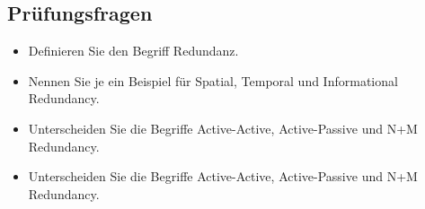 \subsection{Prüfungsfragen}

\begin{itemize}
	\item Definieren Sie den Begriff Redundanz.
	\item Nennen Sie je ein Beispiel für Spatial, Temporal und Informational Redundancy.
	\item Unterscheiden Sie die Begriffe Active-Active, Active-Passive und N+M Redundancy.
\end{itemize}

\begin{itemize}
	\item Unterscheiden Sie die Begriffe Active-Active, Active-Passive und N+M Redundancy.
\end{itemize}

